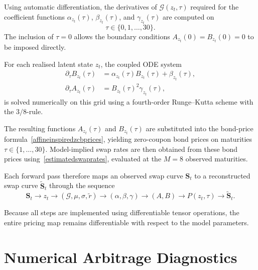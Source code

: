 Using automatic differentiation, the derivatives of $\mathcal{G}(z_t,\tau)$ required for the coefficient functions $\alpha_{z_t}(\tau)$, $\beta_{z_t}(\tau)$, and $\gamma_{z_t}(\tau)$ are computed on
\[
\tau \in \{0,1,\dots,30\}.
\]
The inclusion of $\tau=0$ allows the boundary conditions $A_{z_t}(0)=B_{z_t}(0)=0$ to be imposed directly.

For each realised latent state $z_t$, the coupled ODE system
\begin{align}
\partial_\tau B_{z_t}(\tau) &= \alpha_{z_t}(\tau) B_{z_t}(\tau) + \beta_{z_t}(\tau), \label{eq:B_ode_num} \\
\partial_\tau A_{z_t}(\tau) &= B_{z_t}(\tau)^2 \gamma_{z_t}(\tau), \label{eq:A_ode_num}
\end{align}
is solved numerically on this grid using a fourth-order Runge--Kutta scheme with the $3/8$-rule.

The resulting functions $A_{z_t}(\tau)$ and $B_{z_t}(\tau)$ are substituted into the bond-price formula~\eqref{affineinspiredzcbprices}, yielding zero-coupon bond prices on maturities $\tau \in \{1,\dots,30\}$. Model-implied swap rates are then obtained from these bond prices using~\eqref{estimatedswaprates}, evaluated at the $M=8$ observed maturities.

Each forward pass therefore maps an observed swap curve $\mathbf{S}_t$ to a reconstructed swap curve $\widetilde{\mathbf{S}}_t$ through the sequence
\[
\mathbf{S}_t
\longrightarrow
z_t
\longrightarrow
(\mathcal{G},\mu,\sigma,\tilde r)
\longrightarrow
(\alpha,\beta,\gamma)
\longrightarrow
(A,B)
\longrightarrow
P(z_t,\tau)
\longrightarrow
\widetilde{\mathbf{S}}_t.
\]

Because all steps are implemented using differentiable tensor operations, the entire pricing map remains differentiable with respect to the model parameters.

\section{Numerical Arbitrage Diagnostics}
\label{sec:numerical_arbitrage_diagnostics}

